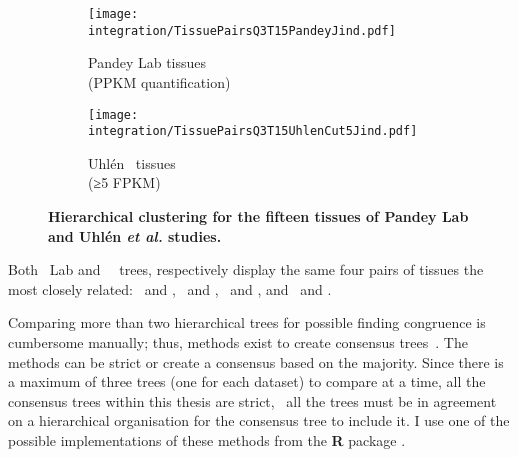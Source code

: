 \begin{figure}[!htp]
    \begin{subfigure}[b]{0.53\textwidth}
        \captionsetup{margin=0.6cm,justification=centering}
        \centering \texttt{[image: integration/TissuePairsQ3T15PandeyJind.pdf]}
        \caption{Pandey Lab tissues\\(PPKM quantification)}\label{fig:treePandeyQ3T15}
    \end{subfigure}%
    \begin{subfigure}[b]{0.53\textwidth}
        \captionsetup{margin=0.6cm,justification=centering}
        \centering \texttt{[image: integration/TissuePairsQ3T15UhlenCut5Jind.pdf]}
        \caption{Uhlén \etal\ tissues\\(≥5 FPKM)}\label{fig:treeUhlenQ3T15cuth5}
    \end{subfigure}
    \vspace{-3mm}
    \caption[Tissues hierachical clustering for Pandey Lab and Uhlén \etal\ data]{\label{fig:separateTree}%
    \textbf{Hierarchical clustering for the fifteen tissues of
    Pandey Lab and Uhlén \textit{et al.} studies.}
    }
\end{figure}

Both \pandey\ Lab and \uhlen\ \etal\ trees,
respectively 
display the same four pairs of tissues the most closely related:
\Rectum\ and \hColon, \Placenta\ and \Lung, \Liver\ and \Kidney,
and \Testis\ and \Ovary.\mybr\

Comparing more than two hierarchical trees for possible finding congruence
is cumbersome manually;
thus, methods exist to create consensus trees~.
The methods can be strict or create a consensus based on the majority.
Since there is a maximum of three trees (one for each dataset)
to compare at a time,
all the consensus trees within this thesis are strict,
\ie\ all the trees must be in agreement on a hierarchical organisation
for the consensus tree to include it.
I use one of the possible implementations of these methods
from the \textbf{\textsf{R}} package
.\mybr\

